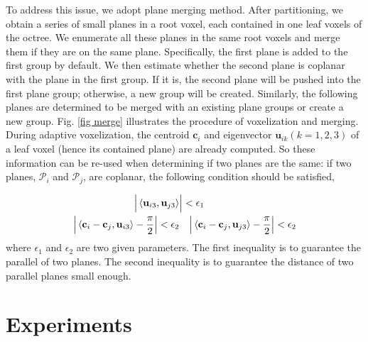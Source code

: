 \documentclass[letterpaper, 10 pt, conference]{ieeeconf}  %
\begin{document}
To address this issue, we adopt plane merging method. After partitioning, we obtain a series of small planes in a root voxel, each contained in one leaf voxels of the octree. We enumerate all these planes in the same root voxels and merge them if they are on the same plane. Specifically, the first plane is added to the first group by default. We then estimate whether the second plane is coplanar with the plane in the first group. If it is, the second plane will be pushed into the first plane group; otherwise, a new group will be created. Similarly, the following planes are determined to be merged with an existing plane groups or create a new group. Fig. \ref{fig merge} illustrates the procedure of voxelization and merging. During adaptive voxelization, the centroid $\mathbf c_i$ and eigenvector $\mathbf u_{ik}$$(k=1,2,3)$ of a leaf voxel (hence its contained plane) are already computed. So these information can be re-used when determining if two planes are the same: if two planes, $\mathcal P_i$ and $\mathcal P_j$, are coplanar, the following condition should be satisfied,

\begin{align}
	\Big | \left\langle \mathbf u_{i3}, \mathbf u_{j3} \right\rangle & \Big |
	< \epsilon_1 \notag
	\\
	\Big | \left\langle \mathbf c_i - \mathbf c_j, \mathbf u_{i3}\right\rangle - \frac{\pi}{2} \Big | < \epsilon_2 &
	\quad
	\Big | \left\langle \mathbf c_i - \mathbf c_j, \mathbf u_{j3}\right\rangle - \frac{\pi}{2} \Big | < \epsilon_2 \label{two-plane-judge}
\end{align}
where $\epsilon_1$ and $\epsilon_2$ are two given parameters. The first inequality is to guarantee the parallel of two planes. The second inequality is to guarantee the distance of two parallel planes small enough.

\section{Experiments} \label{experiment}

\end{document}
